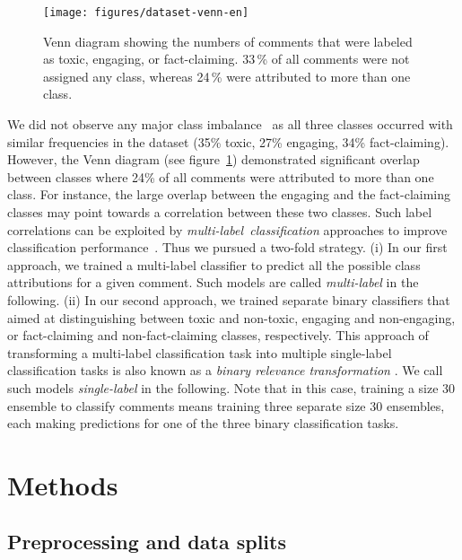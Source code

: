 \documentclass[11pt,a4paper]{article}
\begin{document}
\begin{figure}
    \texttt{[image: figures/dataset-venn-en]}
    \caption{Venn diagram showing the numbers of comments that were labeled as toxic, engaging, or \mbox{fact-claiming}. 33\,\% of all comments were not assigned any class, whereas 24\,\% were attributed to more than one class.}
    \label{fig:venn-diagram}
\end{figure}

We did not observe any major class imbalance~\cite{Haixiang2017} as all three classes occurred with similar frequencies in the dataset (35\% toxic, 27\% engaging, 34\% fact-claiming).
However, the Venn diagram (see figure~\ref{fig:venn-diagram}) demonstrated significant overlap between classes where 24\% of all comments were attributed to more than one class. For instance, the large overlap between the engaging and the fact-claiming classes may point towards a correlation between these two classes. Such label correlations can be exploited by \mbox{\emph{multi-label classification}} approaches to improve classification performance~\citep{Zhang2014}. Thus we pursued a two-fold strategy. (i) In our first approach, we trained a multi-label classifier to predict all the possible class attributions for a given comment. Such models are called \emph{multi-label} in the following. (ii) In our second approach, we trained separate binary classifiers that aimed at distinguishing between toxic and non-toxic, engaging and non-engaging, or fact-claiming and non-fact-claiming classes, respectively. This approach of transforming a multi-label classification task into multiple single-label classification tasks is also known as a \emph{binary relevance transformation} \citep{Zhang2014}. We call such models \emph{single-label} in the following. Note that in this case, training a size 30 ensemble to classify comments means training three separate size 30 ensembles, each making predictions for one of the three binary classification tasks.


\section{Methods}

\subsection{Preprocessing and data splits}
\label{ssec:preprocessing}
\end{document}
